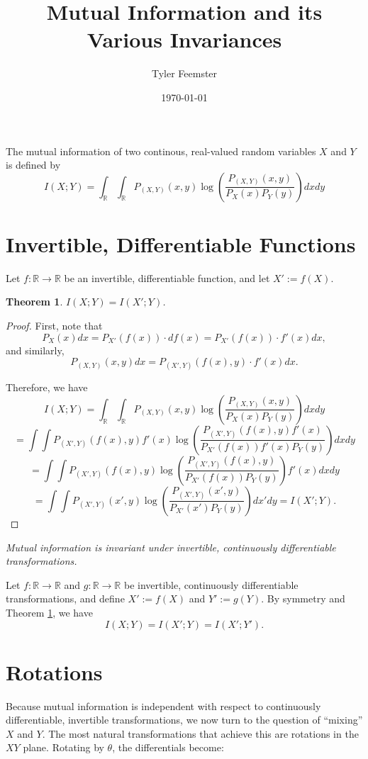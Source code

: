 \documentclass[12pt]{article}
\title{Mutual Information and its Various Invariances}
\author{Tyler Feemster}
\date{\today}
\newcommand{\R}{\mathbb{R}}
\newtheorem{theorem}{Theorem}
\begin{document}
\maketitle

The mutual information of two continous, real-valued random variables $X$ and $Y$ is defined by
$$I(X;Y) = \int_{\R}\int_{\R}P_{(X,Y)}(x,y)\log\left(\frac{P_{(X,Y)}(x,y)}{P_X(x)P_Y(y)}\right)dxdy$$

\section{Invertible, Differentiable Functions}

Let $f : \R \to \R$ be an invertible, differentiable function, and let $X' := f(X)$.

\begin{theorem}\label{MI invariance}
    $I(X;Y) = I(X';Y)$.
\end{theorem}

\begin{proof}
    First, note that
    $$P_X(x)dx = P_{X'}(f(x))\cdot df(x) = P_{X'}(f(x))\cdot f'(x) dx,$$
    and similarly,
    $$P_{(X,Y)}(x,y)dx = P_{(X',Y)}(f(x),y)\cdot f'(x)dx.$$

    Therefore, we have
    $$I(X;Y) = \int_{\R}\int_{\R}P_{(X,Y)}(x,y)\log\left(\frac{P_{(X,Y)}(x,y)}{P_X(x)P_Y(y)}\right)dxdy$$
    $$= \int\int P_{(X',Y)}(f(x),y)f'(x)\log\left(\frac{P_{(X',Y)}(f(x),y)f'(x)}{P_{X'}(f(x))f'(x)P_Y(y)}\right)dxdy$$
    $$= \int\int P_{(X',Y)}(f(x),y)\log\left(\frac{P_{(X',Y)}(f(x),y)}{P_{X'}(f(x))P_Y(y)}\right)f'(x)dxdy$$
    $$= \int\int P_{(X',Y)}(x',y)\log\left(\frac{P_{(X',Y)}(x',y)}{P_{X'}(x')P_Y(y)}\right)dx'dy = I(X';Y).$$
\end{proof}

\begin{center}
\it Mutual information is invariant under invertible, continuously differentiable transformations.
\end{center}

Let $f: \R \to \R$ and $g: \R \to \R$ be invertible, continuously differentiable transformations, and 
define $X' := f(X)$ and $Y' := g(Y)$. By symmetry and Theorem \ref{MI invariance}, we have
$$I(X;Y) = I(X';Y) = I(X';Y').$$ 

\section{Rotations}

Because mutual information is independent with respect to continuously differentiable, invertible transformations, we now turn to the question of ``mixing'' $X$ and $Y$. 
The most natural transformations that achieve this are rotations in the $XY$ plane. Rotating by $\theta$, the differentials become:
\end{document}
